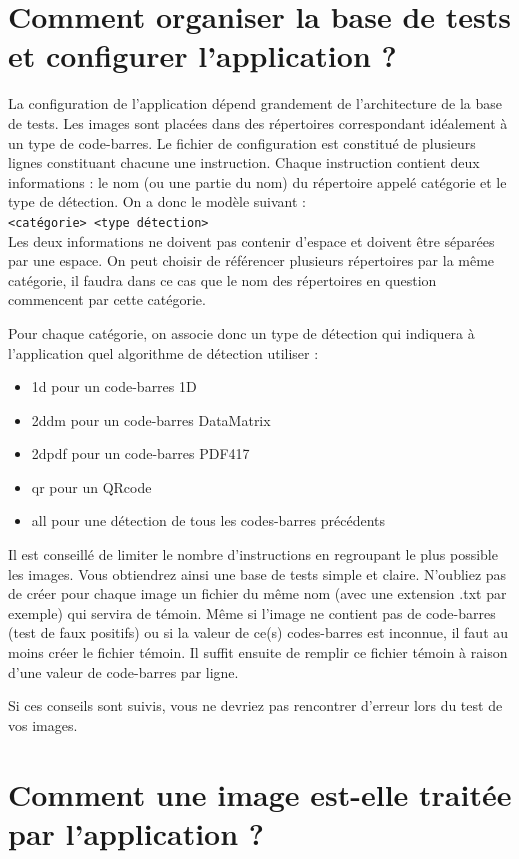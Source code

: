 \chapter{Comment organiser la base de tests et configurer l'application ?}
\label{configFile}
La configuration de l'application dépend grandement de l'architecture de la base de tests. Les images sont placées dans des répertoires correspondant idéalement à un type de code-barres. Le fichier de configuration est constitué de plusieurs lignes constituant chacune une instruction. Chaque instruction contient deux informations : le nom (ou une partie du nom) du répertoire appelé catégorie et le type de détection. On a donc le modèle suivant :
\\\verb|<catégorie> <type détection>|\\
Les deux informations ne doivent pas contenir d'espace et doivent être séparées par une espace. On peut choisir de référencer plusieurs répertoires par la même catégorie, il faudra dans ce cas que le nom des répertoires en question commencent par cette catégorie.

Pour chaque catégorie, on associe donc un type de détection qui indiquera à l'application quel algorithme de détection utiliser :
\begin{itemize}
 \item \og 1d \fg{} pour un code-barres 1D
 \item \og 2ddm \fg{} pour un code-barres DataMatrix
 \item \og 2dpdf \fg{} pour un code-barres PDF417
 \item \og qr \fg{} pour un QRcode
 \item \og all \fg{} pour une détection de tous les codes-barres précédents
\end{itemize}

Il est conseillé de limiter le nombre d'instructions en regroupant le plus possible les images. Vous obtiendrez ainsi une base de tests simple et claire. N'oubliez pas de créer pour chaque image un fichier du même nom (avec une extension .txt par exemple) qui servira de témoin. Même si l'image ne contient pas de code-barres (test de faux positifs) ou si la valeur de ce(s) codes-barres est inconnue, il faut au moins créer le fichier témoin. Il suffit ensuite de remplir ce fichier témoin à raison d'une valeur de code-barres par ligne.

Si ces conseils sont suivis, vous ne devriez pas rencontrer d'erreur lors du test de vos images.

\chapter{Comment une image est-elle traitée par l'application ?}
\label{detectionImage}

